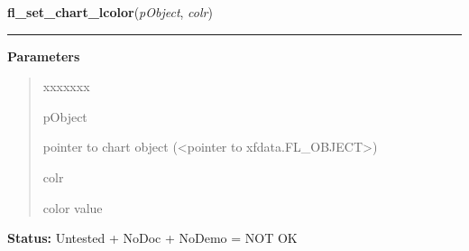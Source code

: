     \label{xformslib:library:fl_set_chart_lcolor}

    \vspace{0.5ex}

\hspace{.8\funcindent}\begin{boxedminipage}{\funcwidth}

    \raggedright \textbf{fl\_set\_chart\_lcolor}(\textit{pObject}, \textit{colr})

    \vspace{-1.5ex}

    \rule{\textwidth}{0.5\fboxrule}
\setlength{\parskip}{2ex}
\setlength{\parskip}{1ex}
      \textbf{Parameters}
      \vspace{-1ex}

      \begin{quote}
        \begin{Ventry}{xxxxxxx}

          \item[pObject]

          pointer to chart object ({\textless}pointer to 
          xfdata.FL\_OBJECT{\textgreater})

          \item[colr]

          color value

        \end{Ventry}

      \end{quote}

\textbf{Status:} Untested + NoDoc + NoDemo = NOT OK



    \end{boxedminipage}

    \label{xformslib:library:fl_set_chart_baseline}

    \vspace{0.5ex}

